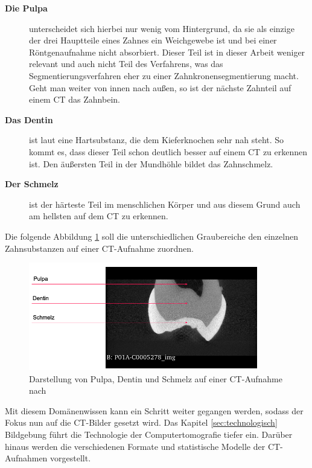 \begin{description}
	\item[\textbf{Die Pulpa}] unterscheidet sich hierbei nur wenig vom Hintergrund,
		da sie als einzige der drei Hauptteile eines Zahnes ein Weichgewebe ist und
		bei einer Röntgenaufnahme nicht absorbiert. Dieser Teil ist in dieser Arbeit
		weniger relevant und auch nicht Teil des Verfahrens, was das
		Segmentierungsverfahren eher zu einer Zahnkronensegmentierung macht. Geht man
		weiter von innen nach außen, so ist der nächste Zahnteil auf einem \ac{CT} das
		Zahnbein.

	\item[\textbf{Das Dentin}] ist laut \citet[S.~41]{lehmann2012Zahnheilkunde}
		eine Hartsubstanz, die dem Kieferknochen sehr nah steht. So kommt es, dass dieser
		Teil schon deutlich besser auf einem \ac{CT} zu erkennen ist. Den äußersten Teil
		in der Mundhöhle bildet das Zahnschmelz.

	\item[\textbf{Der Schmelz}] ist der härteste Teil im menschlichen Körper und aus
		diesem Grund auch am hellsten auf dem \ac{CT} zu erkennen.
\end{description}

Die folgende Abbildung \ref{fig:pulpa_dentin_schmelz} soll die unterschiedlichen
Graubereiche den einzelnen Zahnsubstanzen auf einer \ac{CT}-Aufnahme zuordnen.

\begin{figure}[h]
	\centering
	\includegraphics[width=0.9\textwidth]{img/dentin_schmelz_pulpa.png}
	\caption{Darstellung von Pulpa, Dentin und Schmelz auf einer CT-Aufnahme nach \citet{heck2024}}
	\label{fig:pulpa_dentin_schmelz}
\end{figure}

Mit diesem Domänenwissen kann ein Schritt weiter gegangen werden, sodass der
Fokus nun auf die \ac{CT}-Bilder gesetzt wird. Das Kapitel
\ref{sec:technologisch} Bildgebung führt die Technologie der Computertomografie
tiefer ein. Darüber hinaus werden die verschiedenen Formate und statistische Modelle
der \ac{CT}-Aufnahmen vorgestellt.

